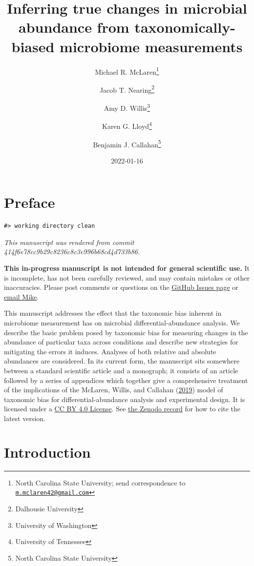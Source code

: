 \documentclass[
]{article}
\title{Inferring true changes in microbial abundance from taxonomically-biased microbiome measurements}
\author{Michael R. McLaren\footnote{North Carolina State University; send correspondence to \href{mailto:m.mclaren42@gmail.com}{\nolinkurl{m.mclaren42@gmail.com}}} \and Jacob T. Nearing\footnote{Dalhousie University} \and Amy D. Willis\footnote{University of Washington} \and Karen G. Lloyd\footnote{University of Tennessee} \and Benjamin J. Callahan\footnote{North Carolina State University}}
\date{2022-01-16}
\begin{document}
\maketitle

{
\setcounter{tocdepth}{2}
\tableofcontents
}
\hypertarget{preface}{%
\section*{Preface}\label{preface}}

\begin{verbatim}
#> working directory clean
\end{verbatim}

\emph{This manuscript was rendered from commit 414f6e78cc9b29c8236c8c3e996b68cd4d733b86.}

\leavevmode{}%
\textbf{This in-progress manuscript is not intended for general scientific use.}
It is incomplete, has not been carefully reviewed, and may contain mistakes or other inaccuracies.
Please post comments or questions on the \href{https://github.com/mikemc/differential-abundance-theory/issues}{GitHub Issues page} or \href{m.mclaren42@gmail.com}{email Mike}.

This manuscript addresses the effect that the taxonomic bias inherent in microbiome measurement has on microbial differential-abundance analysis.
We describe the basic problem posed by taxonomic bias for measuring changes in the abundance of particular taxa across conditions and describe new strategies for mitigating the errors it induces.
Analyses of both relative and absolute abundances are considered.
In its current form, the manuscript sits somewhere between a standard scientific article and a monograph;
it consists of an article followed by a series of appendices which together give a comprehensive treatment of the implications of the McLaren, Willis, and Callahan (\protect\hyperlink{ref-mclaren2019cons}{2019}) model of taxonomic bias for differential-abundance analysis and experimental design.
It is licensed under a \href{https://creativecommons.org/licenses/by/4.0/}{CC BY 4.0 License}.
See \href{https://doi.org/10.5281/zenodo.4552717}{the Zenodo record} for how to cite the latest version.

\hypertarget{introduction}{%
\section{Introduction}\label{introduction}}
\end{document}
